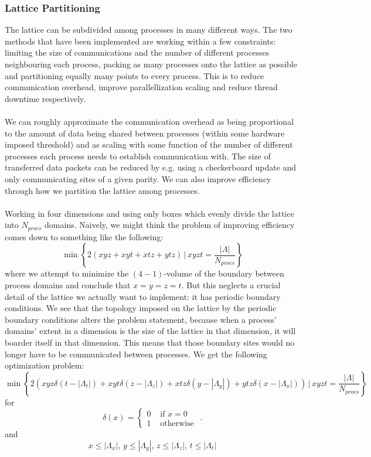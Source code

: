 \documentclass[a4paper,10pt]{article}
\begin{document}
\subsubsection{Lattice Partitioning}
The lattice can be subdivided among processes in many different ways. The two methods that have been implemented are working within a few constraints: limiting the size of communications and the number of different processes neighbouring each process, packing as many processes onto the lattice as possible and partitioning equally many points to every process. This is to reduce communication overhead, improve parallellization scaling and reduce thread downtime respectively.\\\\We can roughly approximate the communication overhead as being proportional to the amount of data being shared between processes (within some hardware imposed threshold) and as scaling with some function of the number of different processes each process needs to establish communication with. The size of transferred data packets can be reduced by e.g. using a checkerboard update and only communicating sites of a given parity. We can also improve efficiency through how we partition the lattice among processes.\\\\Working in four dimensions and using only boxes which evenly divide the lattice into $N_{procs}$ domains. Naively, we might think the problem of improving efficiency comes down to something like the following:
\begin{equation*}
\operatorname{min}\left\{  2(xyz + xyt + xtz + ytz) \,\Big|\,xyzt = \frac{|\Lambda|}{N_{procs}}\right\}
\end{equation*}
where we attempt to minimize the $(4-1)$-volume of the boundary between process domains and conclude that $x=y=z=t$. But this neglects a crucial detail of the lattice we actually want to implement: it has periodic boundary conditions. We see that the topology imposed on the lattice by the periodic boundary conditions alters the problem statement, because when a process' domains' extent in a dimension is the size of the lattice in that dimension, it will boarder itself in that dimension. This means that those boundary sites would no longer have to be communicated between processes. We get the following optimization problem:
\begin{equation*}
\operatorname{min}\left\{  2(xyz\delta(t-|\Lambda_t|) + xyt\delta(z-|\Lambda_z|) + xtz\delta(y-|\Lambda_y|) + ytz\delta(x-|\Lambda_x|)) \,\Big|\,xyzt = \frac{|\Lambda|}{N_{procs}}\right\}
\end{equation*}
for 
\begin{equation*}
\delta(x) = \begin{cases}0 & \text { if }x=0 \\ 1 & \text { otherwise }\end{cases}.
\end{equation*}
and 
\begin{equation*}
x\leq|\Lambda_x|,\,y\leq|\Lambda_y|,\,z\leq|\Lambda_z|,\,t\leq|\Lambda_t|
\end{equation*}
\end{document}
